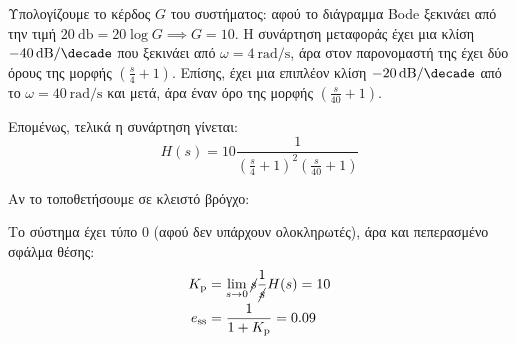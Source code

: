 \documentclass[11pt,a4paper,notitlepage,fleqn,final]{article}
\begin{document}
\begin{exercise}
Υπολογίζουμε το κέρδος \( G \) του συστήματος: αφού το διάγραμμα Bode ξεκινάει από την τιμή
\( \SI{20}{\decibel} = 20\log G \implies G = 10 \). Η συνάρτηση μεταφοράς έχει μια κλίση
\( \SI{-40}{\decibel/\decade} \) που ξεκινάει από \( \omega = \SI{4}{\radian/\second} \),
άρα στον παρονομαστή της έχει δύο όρους της μορφής \( \left(\frac{s}{4}+1\right) \). Επίσης,
έχει μια επιπλέον κλίση \( \SI{-20}{\decibel/\decade} \) από το \( \omega = \SI{40}{\radian/\second} \) και μετά, άρα έναν όρο της μορφής \( \left(\frac{s}{40} + 1\right) \).

Επομένως, τελικά η συνάρτηση γίνεται:
\[
H(s) = 10 \frac{1}{\left(\frac{s}{4}+1\right)^2\left(\frac{s}{40}+1\right)}
\]

Αν το τοποθετήσουμε σε κλειστό βρόγχο:


Το σύστημα έχει τύπο 0 (αφού δεν υπάρχουν ολοκληρωτές), άρα και πεπερασμένο σφάλμα θέσης:
\begin{align*}
	K_{\mathrm{p}} &= \lim_{s\to 0} \cancel{s}\frac{1}{\cancel{s}}H(s) = 10 \\
	e_{\mathrm{ss}} &= \frac{1}{1+K_{\mathrm{p}}} = 0.09
\end{align*}

\end{exercise}
\end{document}
